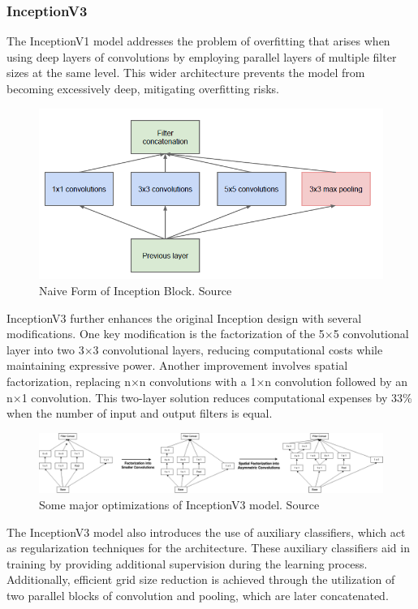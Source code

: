 \subsubsection{InceptionV3}
The InceptionV1 model addresses the problem of overfitting that arises when using deep layers of convolutions by employing parallel layers of multiple filter sizes at the same level. This wider architecture prevents the model from becoming excessively deep, mitigating overfitting risks.

\begin{figure}
\centering
\includegraphics[width=13cm]{images/blackboxes/inception_module.png}
\caption{Naive Form of Inception Block. Source \cite{resnet101}}
\end{figure}

InceptionV3 further enhances the original Inception design with several modifications. One key modification is the factorization of the 5×5 convolutional layer into two 3$\times$3 convolutional layers, reducing computational costs while maintaining expressive power. Another improvement involves spatial factorization, replacing n×n convolutions with a 1×n convolution followed by an n×1 convolution. This two-layer solution reduces computational expenses by 33\% when the number of input and output filters is equal.

\begin{figure}
\centering
\includegraphics[width=13cm]{images/blackboxes/inception3_ideas.png}
\caption{Some major optimizations of InceptionV3 model. Source \cite{inceptionv3}}
\end{figure}

The InceptionV3 model also introduces the use of auxiliary classifiers, which act as regularization techniques for the architecture. These auxiliary classifiers aid in training by providing additional supervision during the learning process. Additionally, efficient grid size reduction is achieved through the utilization of two parallel blocks of convolution and pooling, which are later concatenated.

